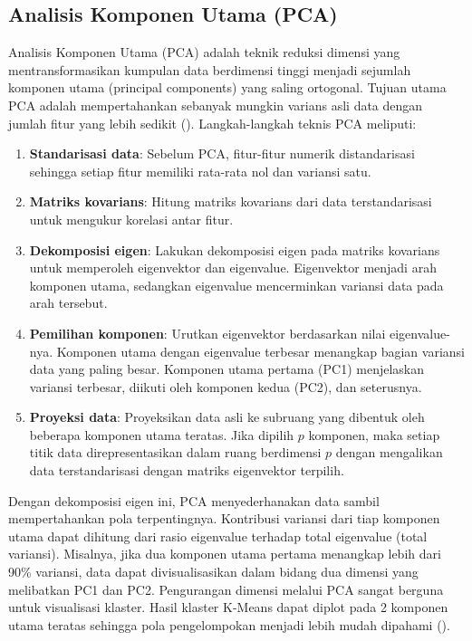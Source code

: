 \subsection{Analisis Komponen Utama (PCA)}
Analisis Komponen Utama (PCA) adalah teknik reduksi dimensi yang mentransformasikan kumpulan data berdimensi tinggi menjadi sejumlah komponen utama (principal components) yang saling ortogonal. Tujuan utama PCA adalah mempertahankan sebanyak mungkin varians asli data dengan jumlah fitur yang lebih sedikit (\cite{You2020}). Langkah-langkah teknis PCA meliputi:
\begin{enumerate}
	\item \textbf{Standarisasi data}: Sebelum PCA, fitur-fitur numerik distandarisasi sehingga setiap fitur memiliki rata-rata nol dan variansi satu.
	\item \textbf{Matriks kovarians}: Hitung matriks kovarians dari data terstandarisasi untuk mengukur korelasi antar fitur.
	\item \textbf{Dekomposisi eigen}: Lakukan dekomposisi eigen pada matriks kovarians untuk memperoleh eigenvektor dan eigenvalue. Eigenvektor menjadi arah komponen utama, sedangkan eigenvalue mencerminkan variansi data pada arah tersebut.
	\item \textbf{Pemilihan komponen}: Urutkan eigenvektor berdasarkan nilai eigenvalue-nya. Komponen utama dengan eigenvalue terbesar menangkap bagian variansi data yang paling besar. Komponen utama pertama (PC1) menjelaskan variansi terbesar, diikuti oleh komponen kedua (PC2), dan seterusnya.
	\item \textbf{Proyeksi data}: Proyeksikan data asli ke subruang yang dibentuk oleh beberapa komponen utama teratas. Jika dipilih $p$ komponen, maka setiap titik data direpresentasikan dalam ruang berdimensi $p$ dengan mengalikan data terstandarisasi dengan matriks eigenvektor terpilih.
\end{enumerate}

Dengan dekomposisi eigen ini, PCA menyederhanakan data sambil mempertahankan pola terpentingnya. Kontribusi variansi dari tiap komponen utama dapat dihitung dari rasio eigenvalue terhadap total eigenvalue (total variansi). Misalnya, jika dua komponen utama pertama menangkap lebih dari 90\% variansi, data dapat divisualisasikan dalam bidang dua dimensi yang melibatkan PC1 dan PC2.
Pengurangan dimensi melalui PCA sangat berguna untuk visualisasi klaster. Hasil klaster K-Means dapat diplot pada 2 komponen utama teratas sehingga pola pengelompokan menjadi lebih mudah dipahami (\cite{Decheva2018}).

